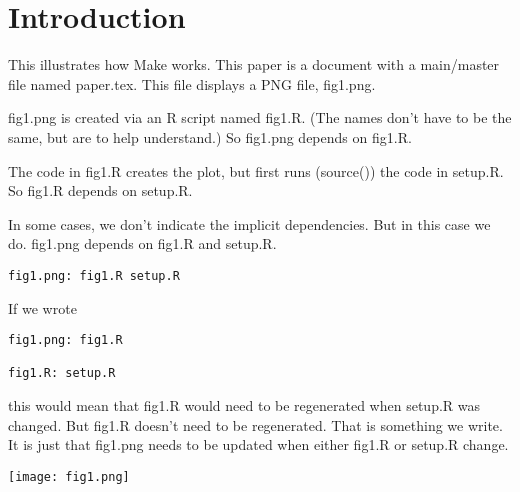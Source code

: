 \documentclass{article}
\begin{document}
\section{Introduction}
This illustrates how Make works.
This paper is a \LaTex{} document
with a main/master file named paper.tex.
This file displays a PNG file, fig1.png.

fig1.png is created via an R script named fig1.R.
(The names don't have to be the same, but are to help understand.)
So fig1.png depends on fig1.R.

The code in fig1.R creates the plot, but first runs (source()) the code
in setup.R.
So fig1.R depends on setup.R.

In some cases, we don't  indicate the implicit dependencies.
But in this case we do.
fig1.png depends on fig1.R and setup.R.

\begin{verbatim}
fig1.png: fig1.R setup.R

\end{verbatim}

If we wrote
\begin{verbatim}
fig1.png: fig1.R 

fig1.R: setup.R
\end{verbatim}
this would mean that fig1.R would need to be regenerated when setup.R
was changed.
But fig1.R doesn't need to be regenerated. That is something we write.
It is just that fig1.png needs to be updated when either fig1.R or setup.R change.

 

\texttt{[image: fig1.png]}


\end{document}
